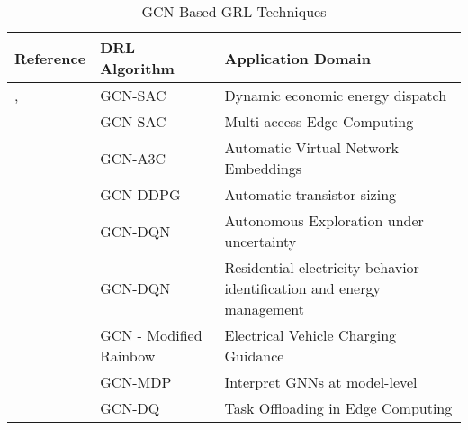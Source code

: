 \documentclass[11pt,a4paper]{article}
\begin{document}
\begin{table}[h!]
\centering
\caption{GCN-Based GRL Techniques}
\begin{tabular}{|P{2cm}|P{2cm}|p{5cm}|  }
 \hline
 \textbf{Reference} & \textbf{DRL Algorithm} & \textbf{Application Domain} \\
 \hline
 \cite{liNovelGraphReinforcement2022}, \cite{chenScalableGraphReinforcement2023} & GCN-SAC & Dynamic economic energy dispatch \\ \hline
 \cite{lengGraphConvolutionalNetworkbased2021} & GCN-SAC & Multi-access Edge Computing \\ \hline
\cite{yanAutomaticVirtualNetwork2020} & GCN-A3C & Automatic Virtual Network Embeddings \\ \hline
\cite{wangGCNRLCircuitDesigner2020} & GCN-DDPG & Automatic transistor sizing \\ \hline
\cite{chenAutonomousExplorationUncertainty2020} & GCN-DQN  & Autonomous Exploration under uncertainty \\  \hline
\cite{chenGraphRepresentationLearningbased2023} & GCN-DQN & Residential electricity behavior identification and energy management \\ \hline
 \cite{xingGraphReinforcementLearningBased2023} & GCN - Modified Rainbow & Electrical Vehicle Charging Guidance \\ \hline
\cite{yuanXGNNModelLevelExplanations2020} & GCN-MDP & Interpret GNNs at model-level \\ \hline
\cite{tangDependentTaskOffloading2020} & GCN-DQ & Task Offloading in Edge Computing \\ \hline
\end{tabular}
\end{table}
\end{document}
